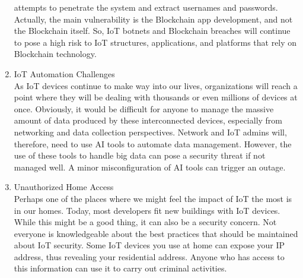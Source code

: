 \documentclass[12pt]{article}
\begin{document}
\begin{enumerate}
 	attempts to penetrate the system and extract usernames and passwords. Actually, the main vulnerability is the Blockchain app development, and not the Blockchain itself. So, IoT botnets and Blockchain breaches will continue to pose a high risk to IoT structures, applications, and platforms that rely on Blockchain technology.
 	\item IoT Automation Challenges\\
 	As IoT devices continue to make way into our lives, organizations will reach a point where they will be dealing with thousands or even millions of devices at once. Obviously, it would be difficult for anyone to manage the massive amount of data produced by these interconnected devices, especially from networking and data 	collection perspectives. Network and IoT admins will, therefore, need to use AI tools to automate data 	management. However, the use of these tools to handle big data can pose a security threat if not managed well. A minor misconfiguration of AI tools can trigger an outage.
 	\item Unauthorized Home Access\\
 	Perhaps one of the places where we might feel the impact of IoT the most is in our homes. Today, most developers fit new buildings with IoT devices. While this might be a good thing, it can also be a security concern. Not everyone is knowledgeable about the best practices that should be maintained about IoT security. Some IoT devices you use at home can expose your IP address, thus revealing your residential address. Anyone who has access to this information can use it to carry out criminal activities.
 \end{enumerate}
 
\end{document}
